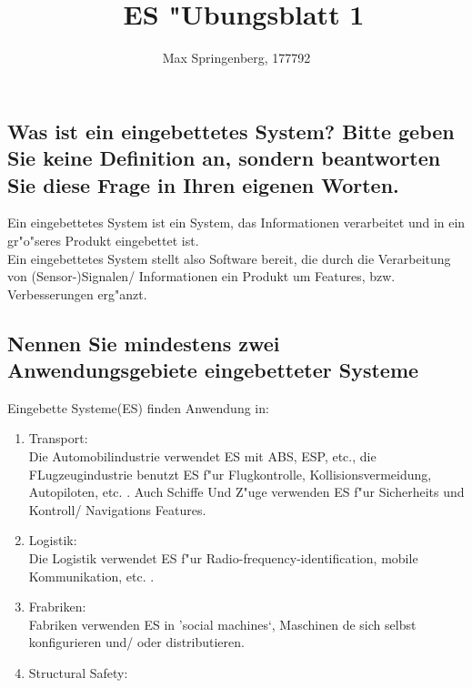 \documentclass{article}
\author{Max Springenberg, 177792}
\title{\
    ES "Ubungsblatt 1
    }
\date{}
\begin{document}
\maketitle
\newpage

\subsection{Was ist ein eingebettetes System? Bitte geben Sie keine Definition 
    an, sondern beantworten Sie diese Frage in Ihren eigenen Worten.}

Ein eingebettetes System ist ein System, das Informationen verarbeitet und in 
    ein gr"o"seres Produkt eingebettet ist.\\
Ein eingebettetes System stellt also Software bereit, die durch die Verarbeitung
    von (Sensor-)Signalen/ Informationen ein Produkt um Features, bzw. 
    Verbesserungen erg"anzt.\\

\subsection{Nennen Sie mindestens zwei Anwendungsgebiete eingebetteter Systeme}

Eingebette Systeme(ES) finden Anwendung in:\\
\begin{enumerate}
    \item Transport:\\
          Die Automobilindustrie verwendet ES mit ABS, ESP, etc., die 
          FLugzeugindustrie benutzt ES f"ur Flugkontrolle, Kollisionsvermeidung,
          Autopiloten, etc. . Auch Schiffe Und Z"uge verwenden ES f"ur Sicherheits
          und Kontroll/ Navigations Features.\\
    \item Logistik:\\
          Die Logistik verwendet ES f"ur Radio-frequency-identification,
          mobile Kommunikation, etc. .\\
    \item Frabriken:\\
          Fabriken verwenden ES in 'social machines`, Maschinen de sich selbst 
          konfigurieren und/ oder distributieren.\\
    \item Structural Safety:\\


\end{enumerate}
\end{document}
